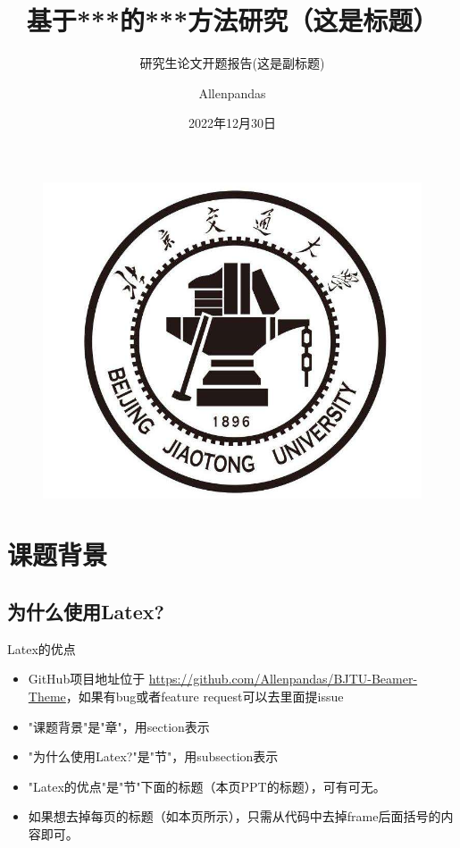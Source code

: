 \documentclass{beamer}
\author{Allenpandas}
\title{基于***的***方法研究（这是标题）}
\subtitle{研究生论文开题报告(这是副标题)}
\institute{北京交通大学·****学院}
\date{2022年12月30日}
\begin{document}
\kaishu
\begin{frame}
    \titlepage
    \begin{figure}[htpb]
        \begin{center}
            \includegraphics[width=0.2\linewidth]{pic/bjtu_logo.jpeg}
        \end{center}
    \end{figure}
\end{frame}


\begin{frame}
    \tableofcontents[sectionstyle=show,subsectionstyle=show/shaded/hide,subsubsectionstyle=show/shaded/hide]
\end{frame}


\section{课题背景}
\subsection{为什么使用Latex?}
\begin{frame}{Latex的优点}
    \begin{itemize}
        \item GitHub项目地址位于 \url{https://github.com/Allenpandas/BJTU-Beamer-Theme}，如果有bug或者feature request可以去里面提issue
        \item "课题背景"是"章"，用section表示
        \item "为什么使用Latex?"是"节"，用subsection表示
        \item "Latex的优点"是"节"下面的标题（本页PPT的标题），可有可无。
    \end{itemize}
\end{frame}

\begin{frame}{}
    \begin{itemize}
        \item 如果想去掉每页的标题（如本页所示），只需从代码中去掉{frame}后面括号的内容即可。
    \end{itemize}
\end{frame}
\end{document}
